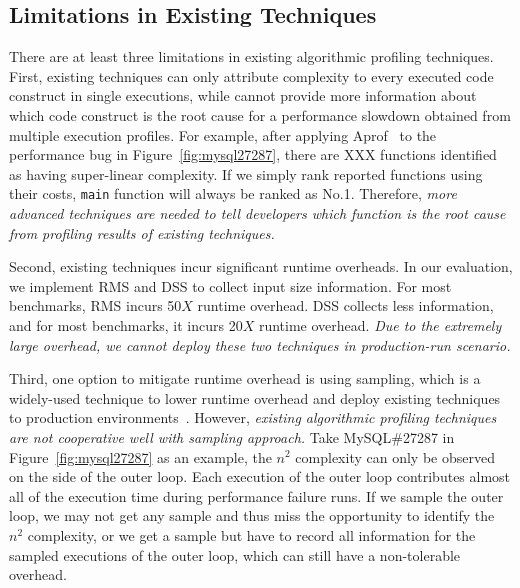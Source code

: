 \subsection{Limitations in Existing Techniques}
\label{subsec:existing}


%
There are at least three limitations in existing algorithmic profiling techniques. 
%
First, existing techniques can only 
attribute complexity to every executed code construct
in single executions, 
while cannot provide more information about 
which code construct is the root cause 
for a performance slowdown obtained from multiple 
execution profiles. 
For example, after applying Aprof~\cite{Aprof1,Aprof2} 
to the performance bug in Figure~\ref{fig:mysql27287}, 
there are {\color{red} XXX} functions identified 
as having super-linear complexity. 
If we simply rank reported functions using their costs, 
\texttt{main} function will always be ranked as No.1. 
Therefore, \emph{
more advanced techniques are needed to tell developers 
which function is the root cause from profiling results of existing techniques. 
}


Second, existing techniques incur significant runtime overheads. 
In our evaluation, we implement RMS and DSS to collect input size information. 
For most benchmarks, RMS incurs 50$X$ runtime overhead. 
DSS collects less information, and for most benchmarks, it incurs 20$X$ runtime overhead. 
\emph{Due to the extremely large overhead, 
we cannot deploy these two techniques in production-run scenario. }


Third, one option to mitigate runtime overhead is using
sampling, which is a widely-used technique to lower runtime overhead 
and deploy existing techniques to production 
environments~\cite{SongOOPSLA2014,liblit03,liblit05,CCI}. 
%
However, \emph{existing algorithmic profiling techniques are not cooperative well with
sampling approach.} 
Take MySQL\#27287 in Figure~\ref{fig:mysql27287} as an example,
the $n^2$ complexity can only be observed on the side of the outer loop. 
Each execution of the outer loop contributes almost all of 
the execution time during performance failure runs. 
If we sample the outer loop, 
we may not get any sample and thus miss the opportunity to 
identify the $n^2$ complexity, or we get a sample but have to 
record all 
information for the sampled executions of the outer loop, 
which can still  have a non-tolerable overhead. 


